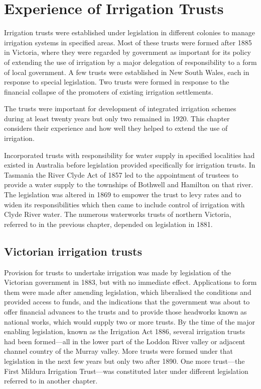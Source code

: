 
\setcounter{endnote}{0}

\chapter{Experience of Irrigation Trusts}

Irrigation trusts were established under legislation in different
colonies to manage irrigation systems in specified areas. Most of
these trusts were formed after 1885 in Victoria, where they were
regarded by government as important for its policy of extending the
use of irrigation by a major delegation of responsibility to a form of
local government.  A few trusts were established in New South Wales,
each in response to special legislation.  Two trusts were formed in
response to the financial collapse of the promoters of existing
irrigation settlements.

The trusts were important for development of integrated irrigation
schemes during at least twenty years but only two remained in 1920.
This chapter considers their experience and how well they helped to
extend the use of irrigation.

Incorporated trusts with responsibility for water supply in specified
localities had existed in Australia before legislation provided
specifically for irrigation trusts.  In Tasmania the River Clyde Act
of 1857 led to the appointment of trustees to provide a water supply
to the townships of Bothwell and Hamilton on that river.  The
legislation was altered in 1869 to empower the trust to levy rates and
to widen its responsibilities which then came to include control of
irrigation with Clyde River water.  The numerous waterworks trusts of northern Victoria,
referred to in the previous chapter, depended on legislation in 1881.

\section*{Victorian irrigation trusts}

Provision for trusts to undertake irrigation was made by legislation
of the Victorian government in 1883, but with no immediate effect.
Applications to form them were made after amending legislation, which
liberalised the conditions and provided access to funds, and the
indications that the government was about to offer financial advances
to the trusts and to provide those headworks known as national works,
which would supply two or more trusts.  By the time of the major
enabling legislation, known as the Irrigation Act 1886, several
irrigation trusts had been formed---all in the lower part of the
Loddon River valley or adjacent channel country of the Murray valley.
More trusts were formed under that legislation in the next few years
but only two after 1890.  One more trust---the First Mildura
Irrigation Trust---was constituted later under different legislation
referred to in another chapter.

